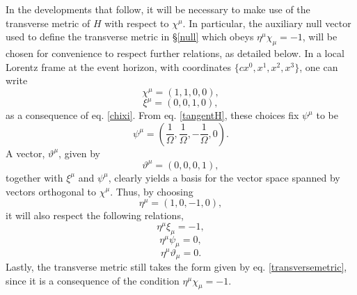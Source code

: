 \documentclass[
12pt,		%
openright,	%
twoside,  %
a4paper,			%
chapter=TITLE,		%
english,			%
french,				%
spanish,			%
brazil				%
]{USPSC-classe/USPSC}
\begin{document}
In the developments that follow, it will be necessary to make use of the transverse metric of $H$ with respect to $\chi^{\mu}$. In particular, the auxiliary null vector used to define the transverse metric in \S\;\ref{null} which obeys $\eta^{\mu}\chi_{\mu}=-1$, will be chosen for convenience to respect further relations, as detailed below. In a local Lorentz frame at the event horizon, with coordinates $\{cx^0,x^1,x^2,x^3\}$, one can write
\begin{equation}
    \chi^{\mu}=(1,1,0,0),
\end{equation}
\begin{equation}
    \xi^{\mu}=(0,0,1,0),
\end{equation}
as a consequence of eq. \ref{chixi}. From eq. \ref{tangentH}, these choices fix $\psi^{\mu}$ to be
\begin{equation}
    \psi^{\mu}=\left(\frac{1}{\Omega},\frac{1}{\Omega},-\frac{1}{\Omega},0\right).
\end{equation}
A vector, $\vartheta^{\mu}$, given by
\begin{equation}
    \vartheta^{\mu}=(0,0,0,1),
\end{equation}
together with $\xi^{\mu}$ and $\psi^{\mu}$, clearly yields a basis for the vector space spanned by vectors orthogonal to $\chi^{\mu}$. Thus, by choosing 
\begin{equation}\label{choice}
    \eta^{\mu}=(1,0,-1,0),
\end{equation}
it will also respect the following relations,
\begin{equation}\label{Auxxi}
    \eta^{\mu}\xi_{\mu}=-1,
\end{equation}
\begin{equation}\label{Auxpsi}
    \eta^{\mu}\psi_{\mu}=0,
\end{equation}
\begin{equation}
    \eta^{\mu}\vartheta_{\mu}=0.
\end{equation}
Lastly, the transverse metric still takes the form given by eq. \ref{transversemetric}, since it is a consequence of the condition $\eta^{\mu}\chi_{\mu}=-1$. 
\end{document}
